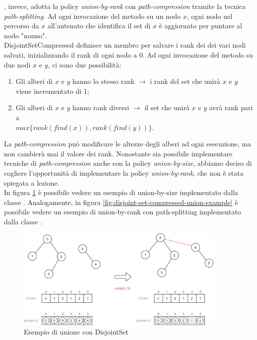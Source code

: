 \noindent {}, invece, adotta la policy \textit{union-by-rank} con \textit{path-compression} tramite la tecnica \textit{path-splitting}.
Ad ogni invocazione del metodo  su un nodo $x$, ogni nodo nel percorso da $x$ all'antenato che identifica il set di $x$ è aggiornato per puntare al nodo "nonno". \\
\noindent DisjointSetCompressed definisce un membro  per salvare i rank dei dei vari nodi salvati, inizializzando il rank di ogni nodo a 0. Ad ogni invocazione del metodo  su due nodi $x$ e $y$, ci sono due possibilità:

\begin{enumerate}
    \item Gli alberi di $x$ e $y$ hanno lo stesso rank $\rightarrow{}$ i rank del set che unirà $x$ e $y$ viene incrementato di 1;
    \item Gli alberi di $x$ e $y$ hanno rank diversi $\rightarrow{}$ il set che unirà $x$ e $y$ avrà rank pari a \\ $max\{ rank(find(x)), rank(find(y)) \}$.
\end{enumerate}

La \textit{path-compression} può modificare le altezze degli alberi ad ogni esecuzione, ma non cambierà mai il valore dei rank.
Nonostante sia possibile implementare tecniche di \textit{path-compression} anche con la policy \textit{union-by-size}, abbiamo deciso di cogliere l'opportunità di implementare la policy \textit{union-by-rank}, che non è stata spiegata a lezione. \\

In figura \ref{fig:disjoint-set-union-example} è possibile vedere un esempio di union-by-size implementato dalla classe . Analogamente, in figura \ref{fig:disjoint-set-compressed-union-example} è possibile vedere un esempio di union-by-rank con path-splitting implementato dalla classe .

\begin{figure}[h]
	\centering
	\includegraphics[width=0.9\textwidth]{./images/DisjointSetExample.png}
	\caption{Esempio di unione con DisjointSet}
	\label{fig:disjoint-set-union-example}
\end{figure}

